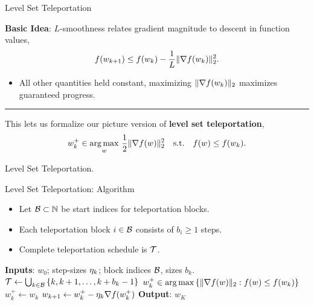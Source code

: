 \documentclass[usenames,dvipsnames,mathserif,notheorems]{beamer}
\newcommand{\horizontalrule}{
	{
			\vspace{-0.5em}
			\center \rule{\textwidth}{0.1em}
			\vspace{-0.2em}
		}
}
\newcommand{\bad}[1]{\textcolor{bad}{#1}}
\newcommand{\good}[1]{\textcolor{good}{#1}}
\begin{document}
\begin{frame}{Level Set Teleportation}

    \textbf{Basic Idea}: \( L \)-smoothness relates
    gradient magnitude to descent in function values,
    \[
        f(w_{k+1}) \leq f(w_k) - \frac{1}{L}\|\nabla f(w_k)\|_2^2.
    \]

    \begin{itemize}
        \item All other quantities \bad{held constant}, maximizing \(
              \|\nabla f(w_k)\|_2 \) maximizes \good{guaranteed progress}.
    \end{itemize}

    \pause
    \horizontalrule
    \vspace{2ex}

    This lets us formalize our picture version of \textbf{level set
        teleportation},
    \[
        w_k^+ \in \mathop{\rm arg\,max}_w \, \frac 1 2 \|\nabla f(w)\|^2_2  \quad \text{s.t.} \quad f(w) \leq f(w_k).
    \]

\end{frame}

\begin{frame}{}
    \begin{center}
        \huge Level Set Teleportation.
    \end{center}
\end{frame}

\begin{frame}{Level Set Teleportation: Algorithm}

    \begin{itemize}
        \item Let \( \mathcal{B} \subset \mathbb{N} \) be \good{start indices} for teleportation
              blocks.
              \pause

        \item Each \good{teleportation block} \( i \in \mathcal{B} \) consists of \( b_i \geq 1 \)
              steps.
              \pause

        \item Complete \good{teleportation schedule} is \( \mathcal{T} \).
    \end{itemize}

    \begin{algorithm}[H]
        \caption{GD with Teleportation}
        \label{alg:gd-with-teleport}
        \begin{algorithmic}
            \STATE \textbf{Inputs}: \( w_0 \); step-sizes \( \eta_k \); block indices \( \mathcal{B} \), sizes \( b_k \).
            \STATE \( \mathcal{T} \gets \bigcup_{k \in \mathcal{B}} \left\{k, k+1, \ldots, k+b_k-1\right\} \)
            \STATE \( w_k^+ \in \mathop{\rm arg\,max} \left\{\|\nabla f(w)\|_2 : f(w) \leq f(w_k)\right\} \)
            \ELSE
            \STATE \( w_k^+ \gets w_k \)
            \ENDIF
            \STATE \( w_{k+1} \gets w_k^+ - \eta_k \nabla f(w_k^+) \)
            \ENDFOR
            \STATE \textbf{Output}: \( w_K \)
        \end{algorithmic}
    \end{algorithm}
\end{frame}
\end{document}
